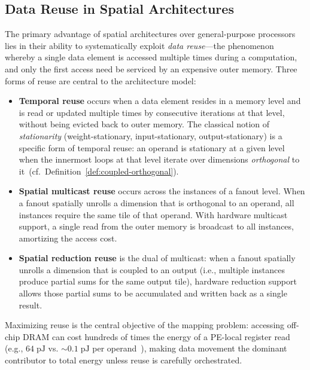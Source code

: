 \subsection{Data Reuse in Spatial Architectures}
\label{sec:data-reuse}

The primary advantage of spatial architectures over general-purpose
processors lies in their ability to systematically exploit
\emph{data reuse}---the phenomenon whereby a single data element
is accessed multiple times during a computation, and only the first
access need be serviced by an expensive outer memory.
Three forms of reuse are central to the architecture model:

\begin{itemize}
  \item \textbf{Temporal reuse} occurs when a data element resides in a
    memory level and is read or updated multiple times by consecutive
    iterations at that level, without being evicted back to outer memory.
    The classical notion of \emph{stationarity} (weight-stationary,
    input-stationary, output-stationary) is a specific form of temporal
    reuse: an operand is stationary at a given level when the innermost
    loops at that level iterate over dimensions \emph{orthogonal} to
    it~(cf.\ Definition~\ref{def:coupled-orthogonal}).

  \item \textbf{Spatial multicast reuse} occurs across the instances
    of a fanout level.
    When a fanout spatially unrolls a dimension that is orthogonal to
    an operand, all instances require the same tile of that operand.
    With hardware multicast support, a single read from the outer memory
    is broadcast to all instances, amortizing the access cost.

  \item \textbf{Spatial reduction reuse} is the dual of multicast:
    when a fanout spatially unrolls a dimension that is coupled to an
    output (i.e., multiple instances produce partial sums for the same
    output tile), hardware reduction support allows those partial sums
    to be accumulated and written back as a single result.
\end{itemize}

Maximizing reuse is the central objective of the mapping problem:
accessing off-chip DRAM can cost hundreds of times the energy
of a PE-local register read (e.g., $64\;\text{pJ}$ vs.
${\sim}0.1\;\text{pJ}$ per operand~\cite{eyeriss}), making data
movement the dominant contributor to total energy unless reuse is
carefully orchestrated.


